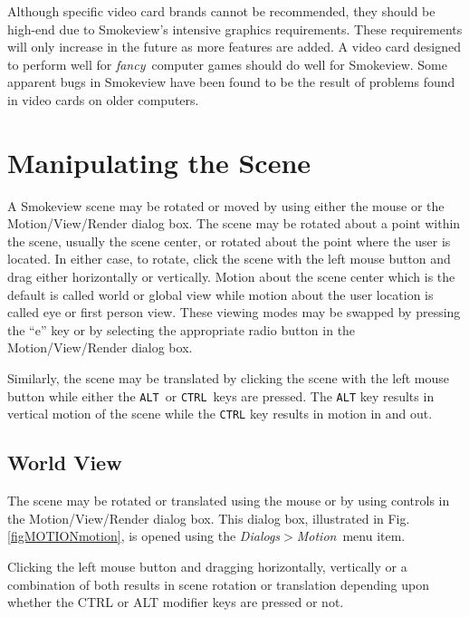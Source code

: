 \documentclass[11pt,twoside]{book}
\begin{document}
Although specific video card brands cannot be recommended, they
should be high-end due to Smokeview's intensive graphics
requirements. These requirements will only increase in the future
as more features are added.  A video card designed to perform well
for {\em fancy}\ computer games should do well for Smokeview. Some
apparent bugs in Smokeview have been found to be the result of
problems found in video cards on older computers.

\section{Manipulating the Scene}

A Smokeview scene may be rotated or moved by using either the mouse or the Motion/View/Render dialog box.
The scene may be rotated about a point within the scene, usually the scene center, or rotated about the point where the user is located.
In either case, to rotate, click the scene with the left mouse button and drag either horizontally or vertically.
Motion about the
scene center which is the default is called world or global view while motion about the
user location is called eye or first person view. These viewing modes
 may be swapped by pressing the ``e'' key or by selecting
the appropriate radio button in the Motion/View/Render
dialog box.

Similarly, the scene may be translated by clicking the scene with the left mouse button while either the {\tt ALT}\ or {\tt CTRL}\ keys are pressed.
The {\tt ALT} key results in vertical motion of the scene while the {\tt CTRL} key results in motion in and out.

\subsection{World View}

The scene may be rotated or translated using the mouse or
by using controls in the Motion/View/Render dialog box.
This dialog box, illustrated in Fig. \ref{figMOTIONmotion}, is opened
using the {\em Dialogs$>$Motion}\ menu item.

Clicking the left mouse button and dragging horizontally,
vertically or a combination of both results in scene rotation or
translation depending upon whether the CTRL or ALT modifier keys
are pressed or not.
\end{document}
